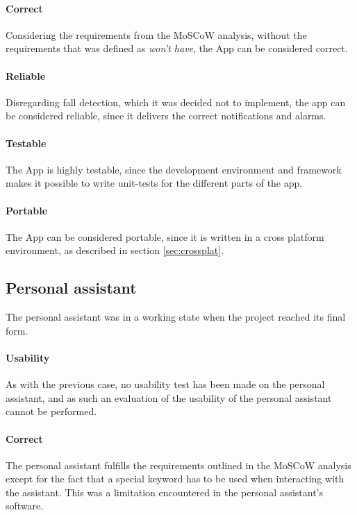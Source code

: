 \paragraph{Correct}
Considering the requirements from the MoSCoW analysis, without the requirements that was defined as \textit{won't have}, the App can be considered correct. 

\paragraph{Reliable}
Disregarding fall detection, which it was decided not to implement, the app can be considered reliable, since it delivers the correct notifications and alarms.

\paragraph{Testable}
The App is highly testable, since the development environment and framework makes it possible to write unit-tests for the different parts of the app. 

\paragraph{Portable}
The App can be considered portable, since it is written in a cross platform environment, as described in section \ref{sec:crossplat}.


\subsection{Personal assistant}
The personal assistant was in a working state when the project reached its final form.
\paragraph{Usability}
As with the previous case, no usability test has been made on the personal assistant, and as such an evaluation of the usability of the personal assistant cannot be performed.

\paragraph{Correct}
The personal assistant fulfills the requirements outlined in the MoSCoW analysis except for the fact that a special keyword has to be used when interacting with the assistant. This was a limitation encountered in the personal assistant's software.

